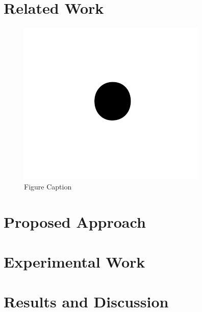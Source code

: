 \documentclass[letterpaper, 10pt, conference]{ieeeconf}
\begin{document}

\section{Related Work}
\label{sec:RelatedWork}

\begin{figure}[ht]
    \centering
    \includegraphics[width=0.9\linewidth]{fig1.png}
    \caption{Figure Caption}
    \label{fig:figureLabel}
\end{figure}

\section{Proposed Approach}
\label{sec:ProposedApproach}



\section{Experimental Work}
\label{sec:ExperimentalWork}




\section{Results and Discussion}
\label{sec:ResultsAndDiscussion}
\end{document}
